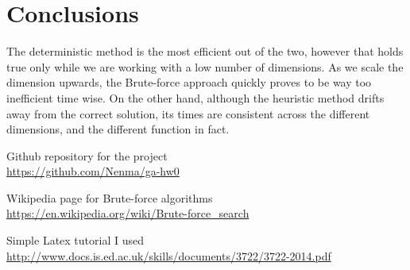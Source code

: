 \documentclass{article}
\begin{document}
\section{Conclusions}
The deterministic method is the most efficient out of the two, however that holds true only while we are working with a low number of dimensions. As we scale the dimension upwards, the Brute-force approach quickly proves to be way too inefficient time wise. On the other hand, although the heuristic method drifts away from the correct solution, its times are consistent across the different dimensions, and the different function in fact. 

\begin{thebibliography}{9}

  Github repository for the project \\
  \url{https://github.com/Nenma/ga-hw0}
  
  Wikipedia page for Brute-force algorithms \\
  \url{https://en.wikipedia.org/wiki/Brute-force_search}
  
  Simple Latex tutorial I used \\
  \url{http://www.docs.is.ed.ac.uk/skills/documents/3722/3722-2014.pdf}

\end{thebibliography}  
\end{document}
